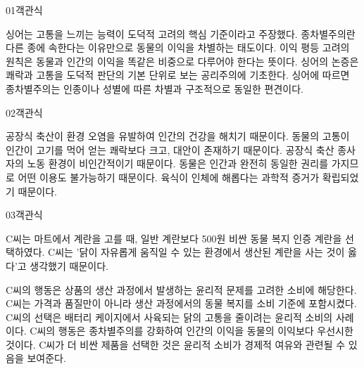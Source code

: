 \documentclass[fs85,seriesWit]{korfarm-base}
\begin{document}
\kfBeginMC
\begin{kfQBlock}{01}{객관식}
\begin{kfChoices}
\kfChoice 싱어는 고통을 느끼는 능력이 도덕적 고려의 핵심 기준이라고 주장했다.
\kfChoice 종차별주의란 다른 종에 속한다는 이유만으로 동물의 이익을 차별하는 태도이다.
\kfChoice 이익 평등 고려의 원칙은 동물과 인간의 이익을 똑같은 비중으로 다루어야 한다는 뜻이다.
\kfChoice 싱어의 논증은 쾌락과 고통을 도덕적 판단의 기본 단위로 보는 공리주의에 기초한다.
\kfChoice 싱어에 따르면 종차별주의는 인종이나 성별에 따른 차별과 구조적으로 동일한 편견이다.
\end{kfChoices}
\end{kfQBlock}

\begin{kfQBlock}{02}{객관식}
\begin{kfChoices}
\kfChoice 공장식 축산이 환경 오염을 유발하여 인간의 건강을 해치기 때문이다.
\kfChoice 동물의 고통이 인간이 고기를 먹어 얻는 쾌락보다 크고, 대안이 존재하기 때문이다.
\kfChoice 공장식 축산 종사자의 노동 환경이 비인간적이기 때문이다.
\kfChoice 동물은 인간과 완전히 동일한 권리를 가지므로 어떤 이용도 불가능하기 때문이다.
\kfChoice 육식이 인체에 해롭다는 과학적 증거가 확립되었기 때문이다.
\end{kfChoices}
\end{kfQBlock}

\begin{kfQBlock}{03}{객관식}
\begin{kfEvidence}C씨는 마트에서 계란을 고를 때, 일반 계란보다 500원 비싼 동물 복지 인증 계란을 선택하였다. C씨는 '닭이 자유롭게 움직일 수 있는 환경에서 생산된 계란을 사는 것이 옳다'고 생각했기 때문이다.\end{kfEvidence}
\begin{kfChoices}
\kfChoice C씨의 행동은 상품의 생산 과정에서 발생하는 윤리적 문제를 고려한 소비에 해당한다.
\kfChoice C씨는 가격과 품질만이 아니라 생산 과정에서의 동물 복지를 소비 기준에 포함시켰다.
\kfChoice C씨의 선택은 배터리 케이지에서 사육되는 닭의 고통을 줄이려는 윤리적 소비의 사례이다.
\kfChoice C씨의 행동은 종차별주의를 강화하여 인간의 이익을 동물의 이익보다 우선시한 것이다.
\kfChoice C씨가 더 비싼 제품을 선택한 것은 윤리적 소비가 경제적 여유와 관련될 수 있음을 보여준다.
\end{kfChoices}
\end{kfQBlock}
\end{document}
